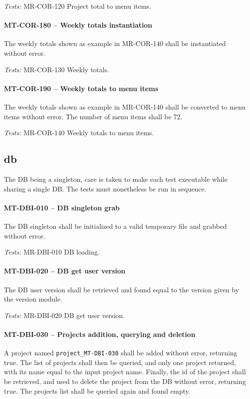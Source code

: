 \textit{Tests: } MR-COR-120 Project total to menu items.

\paragraph{MT-COR-180 -- Weekly totals instantiation}
The weekly totals shown as example in MR-COR-140 shall be
instantiated without error.

\textit{Tests: } MR-COR-130 Weekly totals.

\paragraph{MT-COR-190 -- Weekly totals to menu items}
The weekly totals shown as example in MR-COR-140 shall be converted to menu
items without error. The number of menu items shall be 72.

\textit{Tests: } MR-COR-140 Weekly totals to menu items.

\subsection{db}
The \gls{DB} being a singleton, care is taken to make each test
executable while sharing a single DB. The tests must nonetheless
be run in sequence.

\paragraph{MT-DBI-010 -- DB singleton grab}
The DB singleton shall be initialized to a valid temporary file
and grabbed without error.

\textit{Tests: } MR-DBI-010 DB loading.

\paragraph{MT-DBI-020 -- DB get user version}
The DB user version shall be retrieved and found equal to the version
given by the version module.

\textit{Tests: } MR-DBI-020 DB get user version.

\paragraph{MT-DBI-030 -- Projects addition, querying and deletion}
A project named \lstinline{project_MT-DBI-030} shall be added without
error, returning true.
The list of projects shall then be queried, and only one
project returned, with its name equal to the input project name.
Finally, the id of the project shall be retrieved, and used to
delete the project from the \gls{DB} without error, returning true.
The projects list shall be queried again and found empty.

